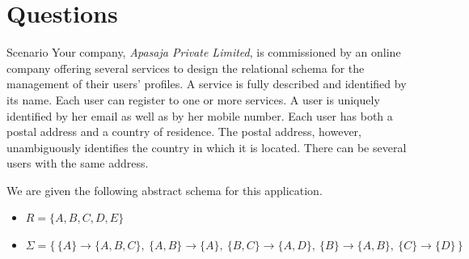 \documentclass{beamer}
\newcommand\fd[2]{\{#1\} \rightarrow \{#2\}}
\begin{document}
\section{Questions}

\begin{frame}{Scenario}
\small
Your company, \emph{Apasaja Private Limited}, is commissioned by an online company offering several services to design the relational schema for the management of their users' profiles. A service is fully described and identified by its name. Each user can register to one or more services. A user is uniquely identified by her email as well as by her mobile number. Each user has both a postal address and a country of residence. The postal address, however, unambiguously identifies the country in which it is located. There can be several users with the same address.
\medskip

We are given the following abstract schema for this application.
\begin{itemize}
  \item $R = \{A, B, C, D, E\}$
  \item $\Sigma = \{\, \fd{A}{A,B,C},\ \fd{A,B}{A},\ \fd{B,C}{A,D},\ \fd{B}{A,B},\ \fd{C}{D} \,\}$
\end{itemize}
\end{frame}
\end{document}
